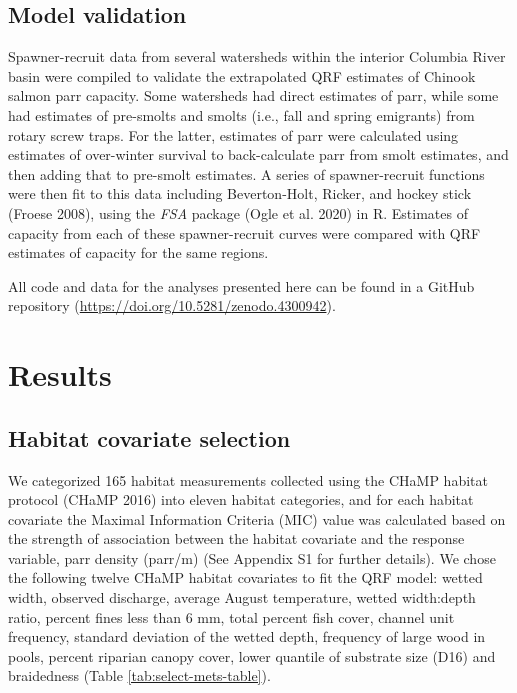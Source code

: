 \documentclass[
  12pt,
]{article}
\begin{document}
\hypertarget{model-validation}{%
\subsection{Model validation}\label{model-validation}}

Spawner-recruit data from several watersheds within the interior Columbia River basin were compiled to validate the extrapolated QRF estimates of Chinook salmon parr capacity. Some watersheds had direct estimates of parr, while some had estimates of pre-smolts and smolts (i.e., fall and spring emigrants) from rotary screw traps. For the latter, estimates of parr were calculated using estimates of over-winter survival to back-calculate parr from smolt estimates, and then adding that to pre-smolt estimates. A series of spawner-recruit functions were then fit to this data including Beverton-Holt, Ricker, and hockey stick (Froese 2008), using the \emph{FSA} package (Ogle et al. 2020) in R. Estimates of capacity from each of these spawner-recruit curves were compared with QRF estimates of capacity for the same regions.

All code and data for the analyses presented here can be found in a GitHub repository (\url{https://doi.org/10.5281/zenodo.4300942}).

\hypertarget{results}{%
\section{Results}\label{results}}

\hypertarget{habitat-covariate-selection-1}{%
\subsection{Habitat covariate selection}\label{habitat-covariate-selection-1}}

We categorized 165 habitat measurements collected using the CHaMP habitat protocol (CHaMP 2016) into eleven habitat categories, and for each habitat covariate the Maximal Information Criteria (MIC) value was calculated based on the strength of association between the habitat covariate and the response variable, parr density (parr/m) (See Appendix S1 for further details). We chose the following twelve CHaMP habitat covariates to fit the QRF model: wetted width, observed discharge, average August temperature, wetted width:depth ratio, percent fines less than 6 mm, total percent fish cover, channel unit frequency, standard deviation of the wetted depth, frequency of large wood in pools, percent riparian canopy cover, lower quantile of substrate size (D16) and braidedness (Table \ref{tab:select-mets-table}).
\end{document}

